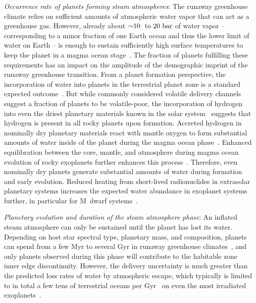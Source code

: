\documentclass[twocolumn,twocolappendix]{aastex631}
\begin{document}
\textit{Occurrence rate of planets forming steam atmospheres}: The runaway greenhouse climate relies on sufficient amounts of atmospheric water vapor that can act as a greenhouse gas.
However, already about $\SIrange{\sim 10}{20} \, \mathrm{bar}$ of water vapor -- corresponding to a minor fraction of one Earth ocean and thus the lower limit of water on Earth -- is enough to sustain sufficiently high surface temperatures to keep the planet in a magma ocean stage~\citep{Boukrouche2021,Lichtenberg2021c}.
The fraction of planets fulfilling these requirements has an impact on the amplitude of the demographic imprint of the runaway greenhouse transition.
From a planet formation perspective, the incorporation of water into planets in the terrestrial planet zone is a standard expected outcome~\citep[e.g.,][]{2019PNAS..116.9723Z,Venturini2020,Emsenhuber2021b,Schlecker2021,Burn2021}.
But while commonly considered volatile delivery channels suggest a fraction of planets to be volatile-poor, the incorporation of hydrogen into even the driest planetary materials known in the solar system~\citep{2020Sci...369.1110P,2021PSJ.....2..244J} suggests that hydrogen is present in all rocky planets upon formation.
Accreted hydrogen in nominally dry planetary materials react with mantle oxygen to form substantial amounts of water inside of the planet during the magma ocean phase~\citep{Ikoma2018,2021ApJ...909L..22K,2020MNRAS.496.3755K,2022NatAs...6.1296K}.
Enhanced equilibration between the core, mantle, and atmosphere during magma ocean evolution of rocky exoplanets further enhances this process~\citep{2021ApJ...914L...4L,Schlichting2022}.
Therefore, even nominally dry planets generate substantial amounts of water during formation and early evolution.
Reduced heating from short-lived radionuclides in extrasolar planetary systems increases the expected water abundance in exoplanet systems further, in particular for M~dwarf systems~\citep{2022ApJ...938L...3L}.

\textit{Planetary evolution and duration of the steam atmosphere phase}: An inflated steam atmosphere can only be sustained until the planet has lost its water.
Depending on host star spectral type, planetary mass, and composition, planets can spend from a few Myr to several Gyr in runaway greenhouse climates~\citep[][]{Hamano2015,Luger2015}, and only planets observed during this phase will contribute to the habitable zone inner edge discontinuity.
However, the delivery uncertainty is much greater than the predicted loss rates of water by atmospheric escape, which typically is limited to in total a few tens of terrestrial oceans per Gyr~\citep{2018AJ....155..195W} on even the most irradiated exoplanets~\citep[see discussion in][]{2022ApJ...938L...3L}.
\end{document}
